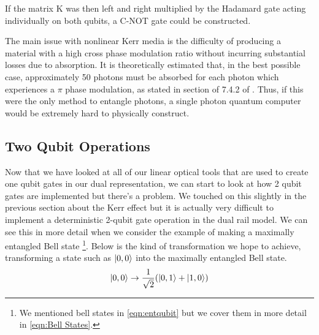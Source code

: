 If the matrix K was then left and right multiplied by the Hadamard gate acting individually on both qubits, a C-NOT gate could be constructed. 

The main issue with nonlinear Kerr media is the difficulty of producing a material with a high cross phase modulation ratio without incurring substantial losses due to absorption. It is theoretically estimated that, in the best possible case, approximately 50 photons must be absorbed for each photon which experiences a $\pi$ phase modulation, as stated in section of 7.4.2 of \cite{nielsen_chuang_2010}. Thus, if this were the only method to entangle photons, a single photon quantum computer would be extremely hard to physically construct.







\subsection{Two Qubit Operations}
Now that we have looked at all of our linear optical tools that are used to create one qubit gates in our dual representation, we can start to look at how 2 qubit gates are implemented but there's a problem. We touched on this slightly in the previous section about the Kerr effect but it is actually very difficult to implement a deterministic 2-qubit gate operation in the dual rail model. We can see this in more detail when we consider the example of making a maximally entangled Bell state \footnote{We mentioned bell states in  \ref{eqn:entqubit} but we cover them in more detail in \ref{eqn:Bell States}.}. Below is the kind of transformation we hope to achieve, transforming a state such as $\ket{0,0}$ into the maximally entangled Bell state.
\begin{equation} \label{bob bell state}
    \ket{0,0} \rightarrow \frac{1}{\sqrt{2}}(\ket{0,1} + \ket{1,0})
\end{equation}

